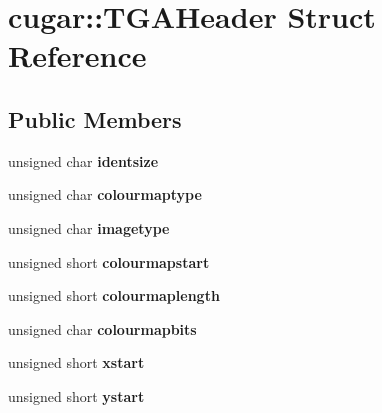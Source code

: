 \hypertarget{structcugar_1_1_t_g_a_header}{}\section{cugar\+:\+:T\+G\+A\+Header Struct Reference}
\label{structcugar_1_1_t_g_a_header}
\subsection*{Public Members}
\begin{DoxyCompactItemize}
\item 
\mbox{\label{structcugar_1_1_t_g_a_header_a2564c184c995e5c765604d747b465a42}} 
unsigned char {\bfseries identsize}
\item 
\mbox{\label{structcugar_1_1_t_g_a_header_a30875db1ddb722ae3f7f3f3bcc71dc6f}} 
unsigned char {\bfseries colourmaptype}
\item 
\mbox{\label{structcugar_1_1_t_g_a_header_a5143baae9b71f26227563fc693590442}} 
unsigned char {\bfseries imagetype}
\item 
\mbox{\label{structcugar_1_1_t_g_a_header_a258f6ceeb4f726aa74c8eec33de463ed}} 
unsigned short {\bfseries colourmapstart}
\item 
\mbox{\label{structcugar_1_1_t_g_a_header_adc57b569cfcd94aa2c710f5cd9a35933}} 
unsigned short {\bfseries colourmaplength}
\item 
\mbox{\label{structcugar_1_1_t_g_a_header_ab4a2859c985d1a32ca73f3cda7d61dae}} 
unsigned char {\bfseries colourmapbits}
\item 
\mbox{\label{structcugar_1_1_t_g_a_header_ac5d41aa8feffa7e83781cccac6ea774e}} 
unsigned short {\bfseries xstart}
\item 
\mbox{\label{structcugar_1_1_t_g_a_header_a2186b329fb3271c2bcd1cbc75efd0c23}} 
unsigned short {\bfseries ystart}
\item 
\mbox{\label{structcugar_1_1_t_g_a_header_afbaf18a860f538d667293871b973a846}} 

\end{DoxyCompactItemize}
